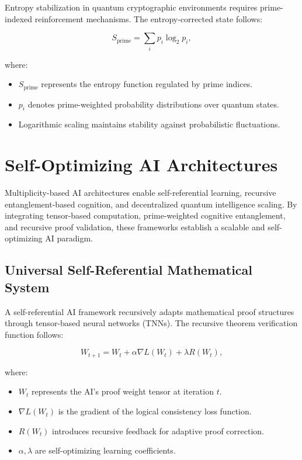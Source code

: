 \documentclass{article}
\theoremstyle{plain}
\begin{document}
\begin{itemize}
\begin{itemize}
Entropy stabilization in quantum cryptographic environments requires prime-indexed reinforcement mechanisms. The entropy-corrected state follows:

\begin{equation}
S_{\text{prime}} = \sum_{i} p_i \log_2 p_i,
\end{equation}

where:
\begin{itemize}
    \item $S_{\text{prime}}$ represents the entropy function regulated by prime indices.
    \item $p_i$ denotes prime-weighted probability distributions over quantum states.
    \item Logarithmic scaling maintains stability against probabilistic fluctuations.
\end{itemize}

\section{Self-Optimizing AI Architectures}

Multiplicity-based AI architectures enable self-referential learning, recursive entanglement-based cognition, and decentralized quantum intelligence scaling. By integrating tensor-based computation, prime-weighted cognitive entanglement, and recursive proof validation, these frameworks establish a scalable and self-optimizing AI paradigm.

\subsection{Universal Self-Referential Mathematical System}

A self-referential AI framework recursively adapts mathematical proof structures through tensor-based neural networks (TNNs). The recursive theorem verification function follows:

\begin{equation}
W_{t+1} = W_t + \alpha \nabla L(W_t) + \lambda R(W_t),
\end{equation}

where:
\begin{itemize}
    \item $W_t$ represents the AI's proof weight tensor at iteration $t$.
    \item $\nabla L(W_t)$ is the gradient of the logical consistency loss function.
    \item $R(W_t)$ introduces recursive feedback for adaptive proof correction.
    \item $\alpha, \lambda$ are self-optimizing learning coefficients.
\end{itemize}


\end{itemize}
\end{itemize}
\end{document}
